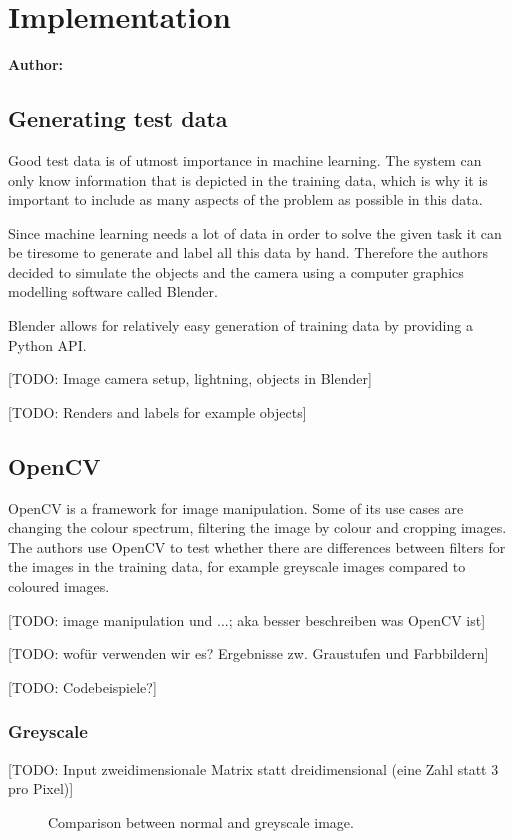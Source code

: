 \chapter{Implementation}

\textbf{Author: } 

\section{Generating test data}
Good test data is of utmost importance in machine learning. The system can only know information that is depicted in the training data, which is why it is important to include as many aspects of the problem as possible in this data.

Since machine learning needs a lot of data in order to solve the given task it can be tiresome to generate and label all this data by hand. Therefore the authors decided to simulate the objects and the camera using a computer graphics modelling software called Blender.

Blender allows for relatively easy generation of training data by providing a Python API.

[TODO: Image camera setup, lightning, objects in Blender]

[TODO: Renders and labels for example objects]

\section{OpenCV}
OpenCV is a framework for image manipulation. Some of its use cases are changing the colour spectrum, filtering the image by colour and cropping images. The authors use OpenCV to test whether there are differences between filters for the images in the training data, for example greyscale images compared to coloured images.

[TODO: image manipulation und ...; aka besser beschreiben was OpenCV ist]

[TODO: wofür verwenden wir es? Ergebnisse zw. Graustufen und Farbbildern]

[TODO: Codebeispiele?]

\subsection{Greyscale}
[TODO: Input zweidimensionale Matrix statt dreidimensional (eine Zahl statt 3 pro Pixel)]

\begin{figure}[h!]
	\centering
	\caption{Comparison between normal and greyscale image.}
	\label{pic:implementation_opencv_greyscale}
\end{figure}

